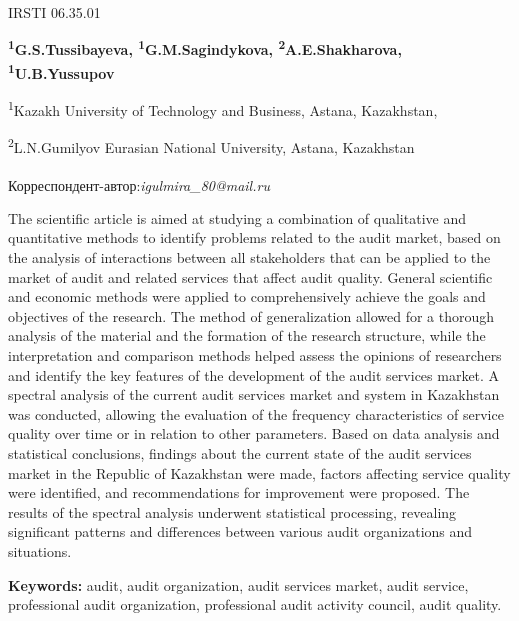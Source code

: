 IRSTI 06.35.01

\begin{articleheader}


  {\bfseries \textsuperscript{1}G.S.Tussibayeva\textsuperscript{\envelope},
\textsuperscript{1}G.M.Sagindykova, \textsuperscript{2}A.E.Shakharova,
\textsuperscript{1}U.B.Yussupov}
\end{articleheader}
\begin{affiliation}

\textsuperscript{1}Kazakh University of Technology and Business, Astana,
Kazakhstan,

\textsuperscript{2}L.N.Gumilyov Eurasian National University, Astana,
Kazakhstan

\raggedright\textbf{\textsuperscript{\envelope}}Корреспондент-автор:\emph{igulmira\_80@mail.ru}
\end{affiliation}

The scientific article is aimed at studying a combination of qualitative
and quantitative methods to identify problems related to the audit
market, based on the analysis of interactions between all stakeholders
that can be applied to the market of audit and related services that
affect audit quality. General scientific and economic methods were
applied to comprehensively achieve the goals and objectives of the
research. The method of generalization allowed for a thorough analysis
of the material and the formation of the research structure, while the
interpretation and comparison methods helped assess the opinions of
researchers and identify the key features of the development of the
audit services market. A spectral analysis of the current audit services
market and system in Kazakhstan was conducted, allowing the evaluation
of the frequency characteristics of service quality over time or in
relation to other parameters. Based on data analysis and statistical
conclusions, findings about the current state of the audit services
market in the Republic of Kazakhstan were made, factors affecting
service quality were identified, and recommendations for improvement
were proposed. The results of the spectral analysis underwent
statistical processing, revealing significant patterns and differences
between various audit organizations and situations.

\textbf{Keywords:} audit, audit organization, audit services market,
audit service, professional audit organization, professional audit
activity council, audit quality.

